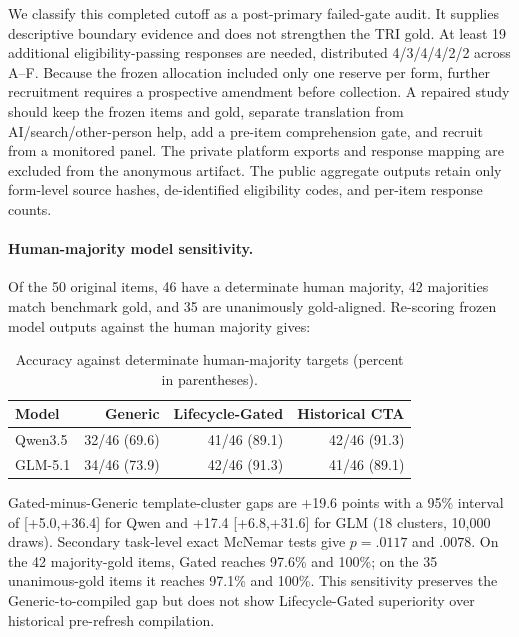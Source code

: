 \documentclass[10pt]{article}
\begin{document}
We classify this completed cutoff as a post-primary failed-gate audit. It supplies descriptive
boundary evidence and does not strengthen the TRI gold. At least 19 additional
eligibility-passing responses are needed,
distributed 4/3/4/4/2/2 across A--F. Because the frozen allocation included only one reserve per
form, further recruitment requires a prospective amendment before collection. A repaired study
should keep the frozen items and gold, separate translation from AI/search/other-person help, add
a pre-item comprehension gate, and recruit from a monitored panel. The private platform exports
and response mapping are excluded from the anonymous artifact. The public aggregate outputs retain
only form-level source hashes, de-identified eligibility codes, and per-item response counts.

\paragraph{Human-majority model sensitivity.}
Of the 50 original items, 46 have a determinate human majority, 42 majorities match benchmark
gold, and 35 are unanimously gold-aligned. Re-scoring frozen model outputs against the human
majority gives:
\begin{table}[H]
\centering
\small
\begin{tabular}{lrrr}
\toprule
Model & Generic & Lifecycle-Gated & Historical CTA\\
\midrule
Qwen3.5 & 32/46 (69.6) & 41/46 (89.1) & 42/46 (91.3)\\
GLM-5.1 & 34/46 (73.9) & 42/46 (91.3) & 41/46 (89.1)\\
\bottomrule
\end{tabular}
\caption{Accuracy against determinate human-majority targets (percent in parentheses).}
\end{table}
Gated-minus-Generic template-cluster gaps are +19.6 points with a 95\% interval of
[+5.0,+36.4] for Qwen and +17.4 [+6.8,+31.6] for GLM (18 clusters, 10,000 draws).
Secondary task-level exact McNemar tests give $p=.0117$ and $.0078$.
On the 42 majority-gold items, Gated reaches 97.6\% and 100\%; on the 35 unanimous-gold
items it reaches 97.1\% and 100\%. This sensitivity preserves the Generic-to-compiled gap but
does not show Lifecycle-Gated superiority over historical pre-refresh compilation.
\end{document}
